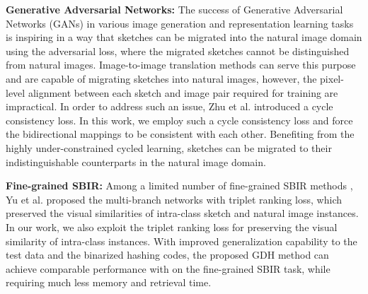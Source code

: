 \documentclass[runningheads]{llncs}
\begin{document}
\noindent\textbf{Generative Adversarial Networks:} The success of Generative Adversarial Networks (GANs) \cite{goodfellow2014generative} in various image generation \cite{denton2015deep} and representation learning \cite{mathieu2016disentangling} tasks is inspiring in a way that sketches can be migrated into the natural image domain using the adversarial loss, where the migrated sketches cannot be distinguished from natural images.  Image-to-image translation methods \cite{sangkloy2017scribbler,pix2pix2017} can serve this purpose and are capable of migrating sketches into natural images, however, the pixel-level alignment between each sketch and image pair required for training are impractical. In order to address such an issue,  Zhu et al. \cite{ZhuPIE17} introduced a cycle consistency loss. In this work, we employ such a cycle consistency loss and force the bidirectional mappings to be consistent with each other. Benefiting from the highly under-constrained cycled learning, sketches can be migrated to their indistinguishable counterparts in the natural image domain. 


\noindent\textbf{Fine-grained SBIR:} Among a limited number of fine-grained SBIR methods \cite{Yu2016shoes,SangkloyBHH16,SongYSXH17,BuiRPC16,XuYHSMWXKG18,LiPSHZH16,QiSZL16,XuYQSMWG16,LiPSHXZ17}, Yu et al. \cite{Yu2016shoes} proposed the multi-branch networks with triplet ranking loss, which preserved the visual similarities of intra-class sketch and natural image instances. In our work, we also exploit the triplet ranking loss for preserving the visual similarity of intra-class instances. With improved generalization capability to the test data and the binarized hashing codes, the proposed GDH method can achieve comparable performance with \cite{Yu2016shoes} on the fine-grained SBIR task, while requiring much less memory and retrieval time. 
\end{document}
